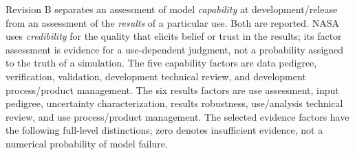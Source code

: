 Revision B separates an assessment of model \emph{capability} at
development/release from an assessment of the \emph{results} of a
particular use. Both are reported. NASA uses \emph{credibility} for
the quality that elicits belief or trust in the results; its factor
assessment is evidence for a use-dependent judgment, not a probability
assigned to the truth of a simulation.
The five capability factors are data pedigree, verification,
validation, development technical review, and development
process/product management. The six results factors are use
assessment, input pedigree, uncertainty characterization, results
robustness, use/analysis technical review, and use process/product
management. The selected evidence factors
have the following full-level distinctions; zero denotes insufficient
evidence, not a numerical probability of model failure.
\cite[Section 3.2 and Appendix E.1--E.4]{NASA7009B2024}

